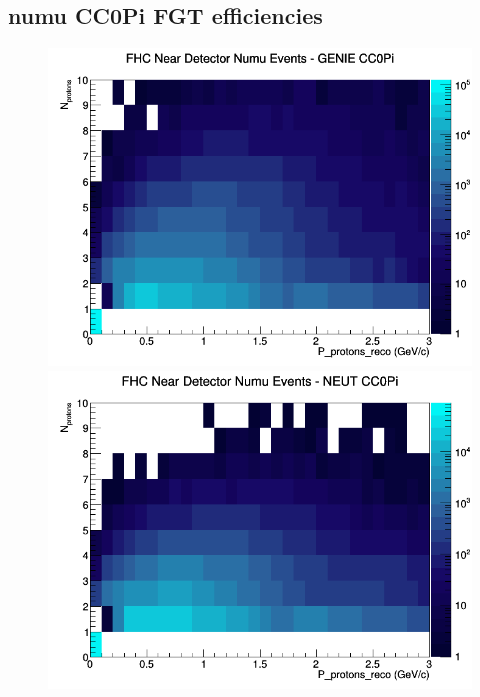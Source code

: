 \documentclass[12pt]{article}
\begin{document}
\subsection{numu CC0Pi FGT efficiencies}
\begin{figure}[h]
\includegraphics[width=\linewidth]{eff_N_P/FGT/protons/CC0Pi_FHC_ND_numu_N_P_GENIE.png}
\endminipage
{}
\includegraphics[width=\linewidth]{eff_N_P/FGT/protons/CC0Pi_FHC_ND_numu_N_P_NEUT.png}
\endminipage
{}

\end{figure}
\end{document}
